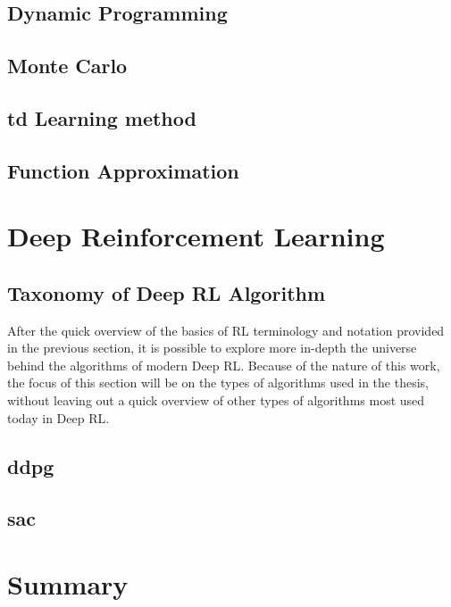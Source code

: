 \subsection{Dynamic Programming}

\subsection{Monte Carlo}

\subsection{\acrshort{td} Learning method}

\subsection{Function Approximation}

\section{Deep Reinforcement Learning}

\subsection{Taxonomy of Deep RL Algorithm}

After the quick overview of the basics of RL terminology and notation provided in the previous section, it is possible to explore more in-depth the universe behind the algorithms of modern Deep RL. Because of the nature of this work, the focus of this section will be on the types of algorithms used in the thesis, without leaving out a quick overview of other types of algorithms most used today in Deep RL.

\subsection{\acrfull{ddpg}}

\subsection{\acrfull{sac}}

\section{Summary}







